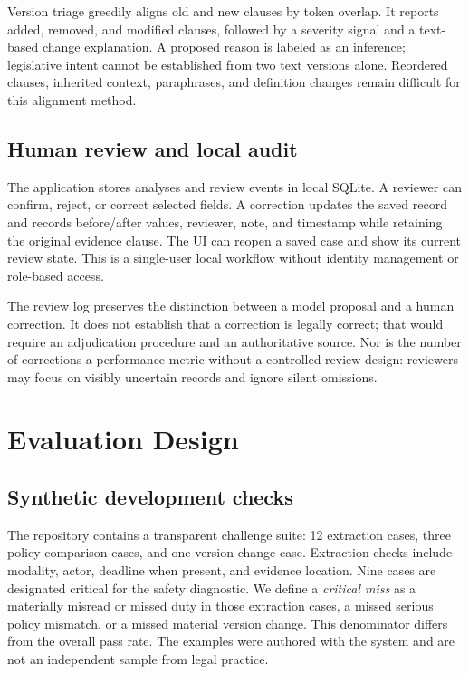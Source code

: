 \documentclass[11pt,a4paper]{article}
\begin{document}
Version triage greedily aligns old and new clauses by token overlap. It reports added, removed, and modified clauses, followed by a severity signal and a text-based change explanation. A proposed reason is labeled as an inference; legislative intent cannot be established from two text versions alone. Reordered clauses, inherited context, paraphrases, and definition changes remain difficult for this alignment method.

\subsection{Human review and local audit}
The application stores analyses and review events in local SQLite. A reviewer can confirm, reject, or correct selected fields. A correction updates the saved record and records before/after values, reviewer, note, and timestamp while retaining the original evidence clause. The UI can reopen a saved case and show its current review state. This is a single-user local workflow without identity management or role-based access.

The review log preserves the distinction between a model proposal and a human correction. It does not establish that a correction is legally correct; that would require an adjudication procedure and an authoritative source. Nor is the number of corrections a performance metric without a controlled review design: reviewers may focus on visibly uncertain records and ignore silent omissions.

\section{Evaluation Design}
\subsection{Synthetic development checks}
The repository contains a transparent challenge suite: 12 extraction cases, three policy-comparison cases, and one version-change case. Extraction checks include modality, actor, deadline when present, and evidence location. Nine cases are designated critical for the safety diagnostic. We define a \emph{critical miss} as a materially misread or missed duty in those extraction cases, a missed serious policy mismatch, or a missed material version change. This denominator differs from the overall pass rate. The examples were authored with the system and are not an independent sample from legal practice.
\end{document}
